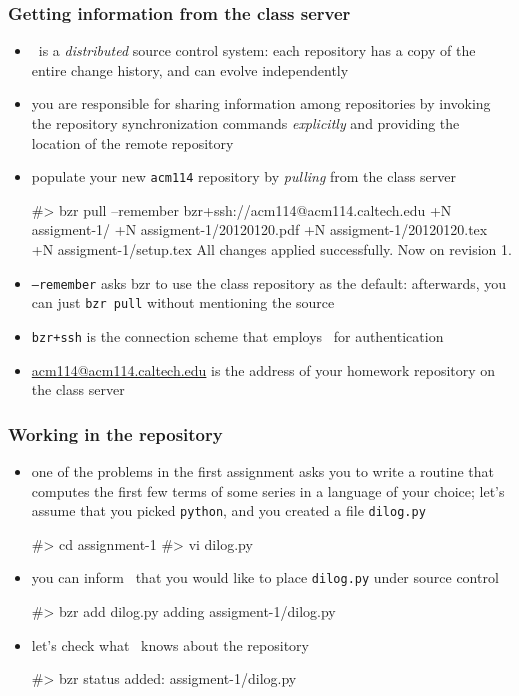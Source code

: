 \begin{frame}[fragile]
%
  \frametitle{Getting information from the class server}
%
  \begin{itemize}
%
  \item \bzr\ is a {\em distributed} source control system: each repository has a copy of the
    entire change history, and can evolve independently
%
  \item you are responsible for sharing information among repositories by invoking the
    repository synchronization commands {\em explicitly} and providing the location of the
    remote repository
%
  \item populate your new {\tt\small acm114} repository by {\em pulling} from the class server
    \begin{shell}{}
#> bzr pull --remember bzr+ssh://acm114@acm114.caltech.edu
+N  assigment-1/                                                                                   
+N  assigment-1/20120120.pdf
+N  assigment-1/20120120.tex
+N  assigment-1/setup.tex
All changes applied successfully.                                                                  
Now on revision 1.
    \end{shell}
%
  \item {\tt\small --remember} asks bzr to use the class repository as the default: afterwards,
    you can just {\tt\small bzr pull} without mentioning the source
  \item {\tt\small bzr+ssh} is the connection scheme that employs \ssh\ for authentication
  \item \url{acm114@acm114.caltech.edu} is the address of your homework repository on the class
    server
  \end{itemize}
%
\end{frame}

\begin{frame}[fragile]
%
  \frametitle{Working in the repository}
%
  \begin{itemize}
%
  \item one of the problems in the first assignment asks you to write a routine that computes
    the first few terms of some series in a language of your choice; let's assume that you
    picked {\tt\small python}, and you created a file {\tt\small dilog.py}
    \begin{shell}{}
#> cd assignment-1
#> vi dilog.py
    \end{shell}
%
  \item you can inform \bzr\ that you would like to place {\tt\small dilog.py} under source
    control
    \begin{shell}{}
#> bzr add dilog.py
adding assigment-1/dilog.py
    \end{shell}
%
  \item let's check what \bzr\ knows about the repository
    \begin{shell}{}
#> bzr status
added:
  assigment-1/dilog.py
    \end{shell}
%
  \end{itemize}
%
\end{frame}

